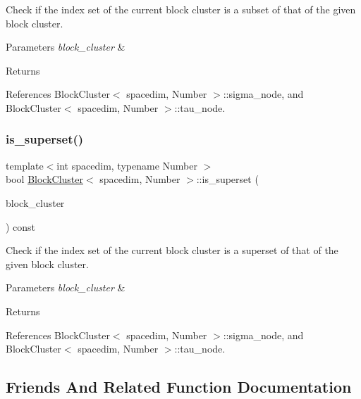 Check if the index set of the current block cluster is a subset of that of the given block cluster. 
\begin{DoxyParams}{Parameters}
{\em block\+\_\+cluster} & \\
\hline
\end{DoxyParams}
\begin{DoxyReturn}{Returns}

\end{DoxyReturn}


References Block\+Cluster$<$ spacedim, Number $>$\+::sigma\+\_\+node, and Block\+Cluster$<$ spacedim, Number $>$\+::tau\+\_\+node.

\mbox{\label{classBlockCluster_a445fc9afc9a246f7d3832c9c96c16d21}} 
\subsubsection{\texorpdfstring{is\+\_\+superset()}{is\_superset()}}
{\footnotesize\ttfamily template$<$int spacedim, typename Number $>$ \\
bool \hyperlink{classBlockCluster}{Block\+Cluster}$<$ spacedim, Number $>$\+::is\+\_\+superset (\begin{DoxyParamCaption}\item[{const \hyperlink{classBlockCluster}{Block\+Cluster}$<$ spacedim, Number $>$ \&}]{block\+\_\+cluster }\end{DoxyParamCaption}) const}

Check if the index set of the current block cluster is a superset of that of the given block cluster. 
\begin{DoxyParams}{Parameters}
{\em block\+\_\+cluster} & \\
\hline
\end{DoxyParams}
\begin{DoxyReturn}{Returns}

\end{DoxyReturn}


References Block\+Cluster$<$ spacedim, Number $>$\+::sigma\+\_\+node, and Block\+Cluster$<$ spacedim, Number $>$\+::tau\+\_\+node.



\subsection{Friends And Related Function Documentation}
\mbox{\label{classBlockCluster_a770daa1c7399aa72cfb7e1e7dc65b6bb}} 

